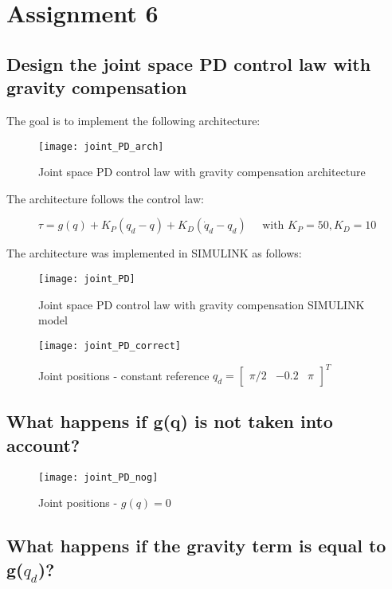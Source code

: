 \section{Assignment 6}

\subsection{Design the joint space PD control law with gravity compensation}

The goal is to implement the following architecture:

\begin{figure}[h]
\centering
\texttt{[image: joint\_PD\_arch]}
\caption{Joint space PD control law with gravity compensation architecture}
\end{figure}

The architecture follows the control law:

\begin{equation*}
\tau = g(q) + K_P(q_d-q) + K_D(\dot q_d -q_d)\;\;\;\;\;\text{with }K_P = 50,K_D =  10
\end{equation*}

The architecture was implemented in SIMULINK as follows:

\begin{figure}[h]
\centering
\texttt{[image: joint\_PD]}
\caption{Joint space PD control law with gravity compensation SIMULINK model}
\end{figure}

\begin{figure}[H]
\centering
\texttt{[image: joint\_PD\_correct]}
\caption{Joint positions - constant reference $q_d=\begin{bmatrix}
\pi/2& -0.2& \pi\end{bmatrix}^T$}
\end{figure}

\subsection{What happens if g(q) is not taken into account?}

\begin{figure}[H]
\centering
\texttt{[image: joint\_PD\_nog]}
\caption{Joint positions - $g(q)=0$}
\end{figure}

\subsection{What happens if the gravity term is equal to g($q_d$)?}


